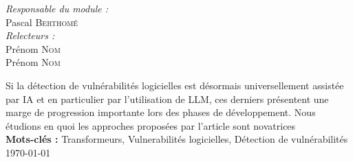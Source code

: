 \begin{titlepage}
\begin{center}
\begin{minipage}{0.4\textwidth}
\begin{flushleft}
            \end{flushleft}
        \end{minipage}
        \begin{minipage}{0.4\textwidth}
            \begin{flushright} \large
                \emph{Responsable du module :} \\
                Pascal \textsc{Berthomé}\\
                \emph{Relecteurs :} \\
                Prénom \textsc{Nom}\\
                Prénom \textsc{Nom}\\
            \end{flushright}
        \end{minipage}
        \vfill
        Si la détection de vulnérabilités logicielles est désormais universellement assistée par
        IA et en particulier par l'utilisation de LLM, ces derniers présentent une marge de
        progression importante lors des phases de développement. Nous étudions en quoi les
        approches proposées par l'article sont novatrices \\
        \textbf{Mots-clés :} Transformeurs, Vulnerabilités logicielles, Détection de
    vulnérabilités\\
        \vfill
        {\large \today}
    \end{center}
\end{titlepage}
